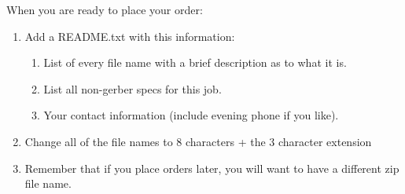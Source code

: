 When you are ready to place your order:

\begin{enumerate}
	\item Add a README.txt with this information:
	\begin{enumerate}
		\item List of every file name with a brief description as to what it is.
		\item List all non-gerber specs for this job.
		\item Your contact information (include evening phone if you like).
	\end{enumerate}
	\item Change all of the file names to 8 characters + the 3 character extension
	\item Remember that if you place orders later, you will want to have a different zip file name.
\end{enumerate}